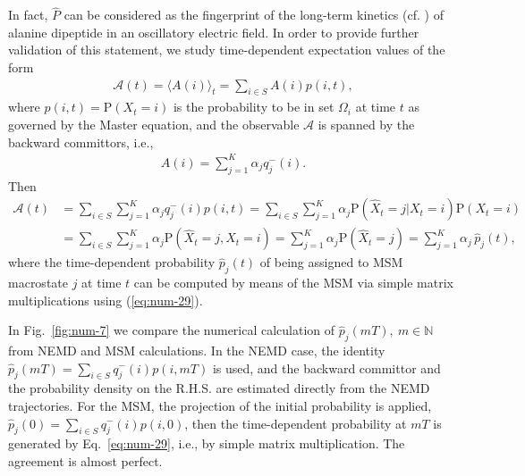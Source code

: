\documentclass[aps, pre, preprint,unsortedaddress,a4paper,onecolumn]{revtex4}
\newcommand{\recheck}[1]{{\color{red} #1}}
\newcommand{\bwd}[0]{-}
\newcommand{\prob}{\textrm{P}}
\begin{document}
In fact, $\hat{P}$ can be considered as the fingerprint of the long-term kinetics (cf. \cite{A19-39,PrinzKellerNoe_PCCP11_Perspective}) of alanine dipeptide in an oscillatory electric field.
In order to provide further validation of this statement, we study  time-dependent expectation values of
the form
\begin{align}
  \mathcal A(t) = \langle A(i)\rangle_t = \sum_{i\in S} A(i) p(i,t),
\end{align}
where $p(i,t)=\prob(X_t=i)$ is the probability to be in set $\Omega_i$ at time $t$ as governed by the Master equation, and the observable $\mathcal A$ is spanned by the backward
committors, i.e.,
\begin{align}\label{A}
  A(i) = \sum_{j=1}^K \alpha_j q^\bwd_j(i).
\end{align}
Then
\begin{align}\nonumber
  \mathcal A(t) &=
  \sum_{i\in S} \sum_{j=1}^K \alpha_j q^\bwd_j(i)  p(i,t)=\sum_{i\in S} \sum_{j=1}^K \alpha_j \prob (\hat X_t = j \vert X_t = i) \prob (X_t = i) \\
  & =
  \sum_{i\in S} \sum_{j=1}^K \alpha_j \prob (\hat X_t = j ,X_t = i)  =
  \sum_{j=1}^K \alpha_j \prob (\hat X_t = j) 
 =
   \sum_{j=1}^K \alpha_j \,\hat p_j (t), \label{eq:num-28}
\end{align}
where the time-dependent probability $\hat{p}_j(t)$ of being assigned to MSM macrostate $j$ at time $t$ can be computed  by means of the MSM via simple matrix multiplications using (\ref{eq:num-29}).

In Fig.~\ref{fig:num-7} we compare the numerical calculation of $\hat p_j (mT), \ m\in\mathbb N$ from NEMD and MSM calculations.
In the NEMD case, the identity  $\hat p_j (mT) = \sum_{i\in S}  q^\bwd_j(i)  p(i,mT) $ is used, and
the backward committor and the probability density on the R.H.S.
are estimated directly from the
NEMD trajectories. For the MSM, the projection of the initial probability is applied, $\hat p_j (0) = \sum_{i\in S}  q^\bwd_j(i)  p(i,0) $, then
the time-dependent probability at $mT$ is generated by Eq.~\eqref{eq:num-29}, i.e., by simple matrix multiplication. The agreement is almost perfect.

\end{document}
